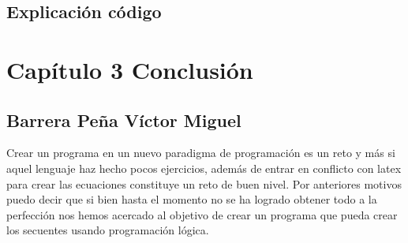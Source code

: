 \begin{Shaded}
\begin{Highlighting}[]
\FunctionTok{//} 
\NormalTok{sq([}\FunctionTok{|}\NormalTok{]}\KeywordTok{,}\NormalTok{)}\KeywordTok{:{-}}
\NormalTok{append([}\NormalTok{,}\NormalTok{]}\KeywordTok{,}\KeywordTok{,}\NormalTok{)}\KeywordTok{,}
\KeywordTok{,}\NormalTok{)}\KeywordTok{,}
\NormalTok{append([}\NormalTok{,}\NormalTok{]}\KeywordTok{,}\KeywordTok{,}\NormalTok{)}\KeywordTok{,}
\KeywordTok{,}\NormalTok{)}

\KeywordTok{,}\NormalTok{[}\FunctionTok{|}\NormalTok{])}\KeywordTok{:{-}}
\NormalTok{sq([}\FunctionTok{|}\NormalTok{]}\KeywordTok{,}\NormalTok{[}\FunctionTok{|}\NormalTok{])}\KeywordTok{,}
\NormalTok{sq([}\FunctionTok{|}\NormalTok{]}\KeywordTok{,}\NormalTok{[}\FunctionTok{|}\NormalTok{])}
\end{Highlighting}
\end{Shaded}

\hypertarget{explicaciuxf3n-cuxf3digo}{%
\subsection{Explicación código}\label{explicaciuxf3n-cuxf3digo}}

\hypertarget{capuxedtulo-3-conclusiuxf3n}{%
\section{Capítulo 3 Conclusión}\label{capuxedtulo-3-conclusiuxf3n}}

\hypertarget{barrera-peuxf1a-vuxedctor-miguel}{%
\subsection{Barrera Peña Víctor
Miguel}\label{barrera-peuxf1a-vuxedctor-miguel}}

Crear un programa en un nuevo paradigma de programación es un reto y más
si aquel lenguaje haz hecho pocos ejercicios, además de entrar en
conflicto con latex para crear las ecuaciones constituye un reto de buen
nivel. Por anteriores motivos puedo decir que si bien hasta el momento
no se ha logrado obtener todo a la perfección nos hemos acercado al
objetivo de crear un programa que pueda crear los secuentes usando
programación lógica.

